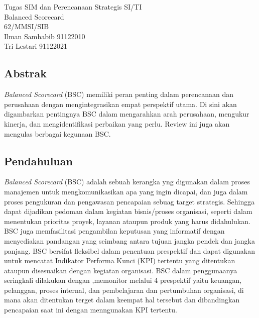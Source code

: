 \documentclass{article}
\title{}
\begin{document}
\begin{center}
    Tugas SIM dan Perencanaan Strategis SI/TI\\
    Balanced Scorecard\\
    62/MMSI/SIB\\
    Ilman Samhabib 91122010\\
    Tri Lestari 91122021\\	
\end{center}
\subsection*{Abstrak}



\emph{Balanced Scorecard} (BSC) memiliki peran penting dalam perencanaan dan perusahaan dengan mengintegrasikan empat perspektif utama. Di sini akan digambarkan pentingnya BSC dalam mengarahkan arah perusahaan, mengukur kinerja, dan mengidentifikasi perbaikan yang perlu. Review ini juga akan mengulas berbagai kegunaan BSC.
\subsection*{Pendahuluan}
\emph{Balanced Scorecard} (BSC) adalah sebuah kerangka yng digunakan dalam proses manajemen untuk mengkomunikasikan apa yang ingin dicapai, dan juga dalam proses pengukuran dan pengawasan pencapaian sebuag target strategis. Sehingga dapat dijadikan pedoman dalam kegiatan bisnis/proses organisasi, seperti dalam menentukan  prioritas proyek, layanan ataupun produk  yang harus didahulukan. BSC juga memfasilitasi pengambilan keputusan yang informatif dengan menyediakan pandangan yang seimbang antara tujuan jangka pendek dan jangka panjang. BSC bersifat fleksibel dalam penentuan prespektif dan dapat digunakan untuk mencatat Indikator Performa Kunci (KPI) tertentu yang ditentukan ataupun disesuaikan dengan kegiatan organisasi. BSC dalam penggunaanya seringkali dilakukan dengan ,memonitor melalui 4 prespektif yaitu  keuangan, pelanggan, proses internal, dan pembelajaran dan pertumbuhan organisasi, di mana akan ditentukan terget dalam keempat hal tersebut dan dibandingkan pencapaian saat ini dengan menngunakan KPI tertentu. 
\end{document}
